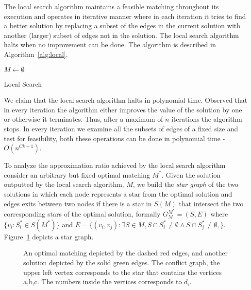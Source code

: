 The local search algorithm maintains a feasible matching throughout its execution
and operates in 
iterative manner where in each iteration it tries to find a better solution by
replacing a subset of the edges in the current solution with 
another (larger) subset of edges not in the solution.
The local search algorithm halts when no improvement can be done.
The algorithm is described in Algorithm~\ref{alg:local}. 

\begin{algorithm}
$M \leftarrow \emptyset$								\\

\caption{
\label{alg:local}
Local Search}
\end{algorithm}


We claim that the local search algorithm halts in polynomial time.
Observed that in every iteration the algorithm either improves the value of the solution
by one or otherwise it terminates. 
Thus, after a maximum of $n$ iterations the algorithm stops.
In every iteration we examine all the subsets of edges of a fixed size and test for feasibility,
both these operations can be done in polynomial time - $O(n^{Ck + 1})$. 

To analyze the approximation ratio achieved by the local search algorithm consider an 
arbitrary but fixed optimal matching $M^*$.
Given the solution outputted by the local search algorithm, 
$M$, 
we build the \emph{star graph} of the two solutions
in which each node represents a star from the optimal solution 
and edges exits between two nodes if
there is a star in $S(M)$ that intersect the two
corresponding stars of the optimal solution, 
formally $G^{M^*}_M = (S, E)$ where $\{v_i : S^*_i \in S(M^*) \}$ 
and 
$E = \{(v_i, v_j) : 
\exists S \in M,
S \cap S^*_i \neq \emptyset \land S \cap S^*_j \neq \emptyset,
\}$.
Figure~\ref{fig:conflict} depicts a star graph.

\begin{figure}[h]
\centering
\subfloat[]{
\label{subfloat:graph}

}
\subfloat[]{
\label{subfloat:conflict}

}
\caption[]{
\label{fig:conflict}
An optimal matching depicted by the dashed red edges,
and another solution depicted by the solid green edges.  
The conflict graph, the upper left vertex corresponds 
to the star that contains the vertices a,b,c.
The numbers inside the vertices corresponds to $d_i$.   
}
\end{figure}  

